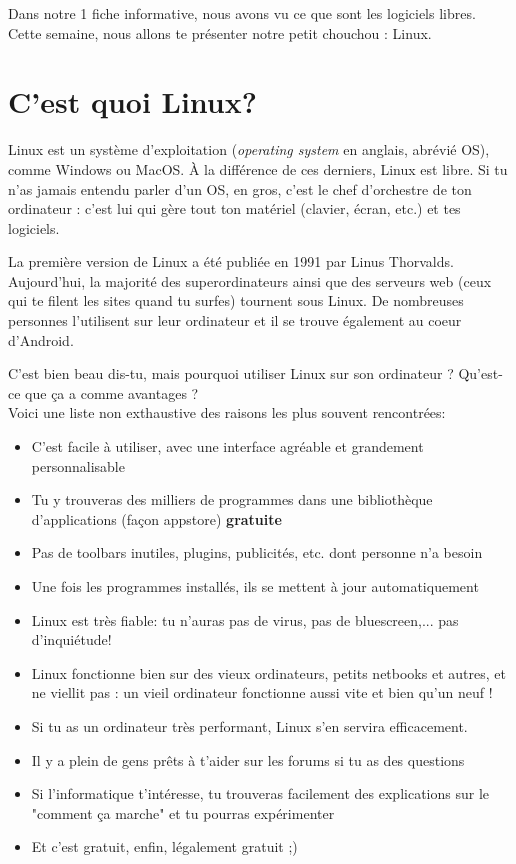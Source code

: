 \documentclass[10pt]{../fiche}
\begin{document}

\vspace*{0.5cm} Dans notre 1 fiche informative, nous avons vu ce que sont les logiciels libres. Cette semaine, nous allons te présenter notre petit chouchou : Linux.

\section*{C'est quoi Linux?}

Linux est un système d'exploitation (\textit{operating system} en anglais, abrévié OS), comme Windows ou MacOS. À la différence de ces derniers, Linux est libre. Si tu n'as jamais entendu parler d'un OS, en gros, c'est le chef d'orchestre de ton ordinateur : c'est lui qui gère tout ton matériel (clavier, écran, etc.) et tes logiciels.

La première version de Linux a été publiée en 1991 par Linus Thorvalds.
Aujourd'hui, la majorité des superordinateurs ainsi que des serveurs web (ceux qui te filent les sites quand tu surfes)
tournent sous Linux. De nombreuses personnes l'utilisent sur leur ordinateur et il se trouve également au coeur d'Android.
\vspace{0.5cm}

C'est bien beau dis-tu, mais pourquoi utiliser Linux sur son ordinateur ? Qu'est-ce que ça a comme avantages ?\\
Voici une liste non exthaustive des raisons les plus souvent rencontrées:
\begin{itemize}
    \item C'est facile à utiliser, avec une interface agréable et grandement personnalisable
    \item Tu y trouveras des milliers de programmes dans une bibliothèque d'applications (façon appstore) \textbf{gratuite}
    \item Pas de toolbars inutiles, plugins, publicités, etc. dont personne n'a besoin
    \item Une fois les programmes installés, ils se mettent à jour automatiquement
    \item Linux est très fiable: tu n'auras pas de virus,
        pas de bluescreen,... pas d'inquiétude!
    \item Linux fonctionne bien sur des vieux ordinateurs, petits netbooks et autres, et
        ne viellit pas : un vieil ordinateur fonctionne aussi vite et bien qu'un neuf !
    \item Si tu as un ordinateur très performant, Linux s'en servira efficacement.
    \item Il y a plein de gens prêts à t'aider sur les forums si tu as des questions
    \item Si l'informatique t'intéresse, tu trouveras
        facilement des explications sur le "comment ça marche" et tu pourras
        expérimenter
    \item Et c'est gratuit, enfin, légalement gratuit ;)
\end{itemize}
\end{document}
